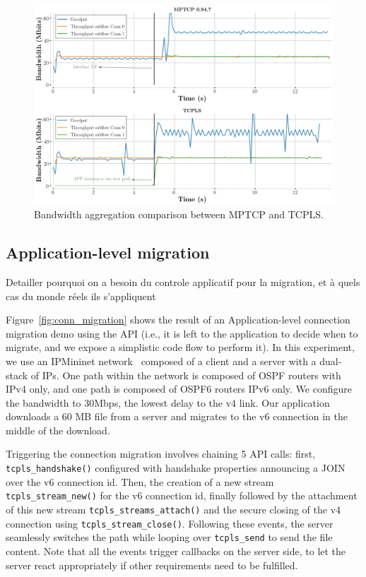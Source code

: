 \begin{figure}[!t] \begin{center}
    \includegraphics[width=\columnwidth]{figures/aggregate_dual.png}
  \end{center} \caption{Bandwidth aggregation comparison between MPTCP and
    TCPLS.} \end{figure}

\subsection{Application-level migration}

Detailler pourquoi on a besoin du controle applicatif pour la migration, et à
quels cas du monde réels ils s'appliquent


Figure~\ref{fig:conn_migration} shows the result of an Application-level
connection migration demo using the API (i.e., it is left to the
application to decide when to migrate, and we expose a simplistic code flow to
perform it). In this experiment, we use an IPMininet network~\cite{ipmininet, jadin2020educational}
composed of a client and a server with a dual-stack of IPs. One path within the
network is composed of OSPF routers with IPv4 only, and one path is composed of
OSPF6 routers IPv6 only. We configure the bandwidth to 30Mbps, the lowest delay
to the v4 link. Our application
downloads a 60 MB file from a server and migrates to the v6 connection in
the middle of the download.

Triggering the connection migration involves chaining 5 API calls:
first, \texttt{tcpls\_handshake()} configured with handshake properties announcing a JOIN over the v6 connection id. Then, the creation of a new stream
\texttt{tcpls\_stream\_new()} for the v6 connection id, finally followed by the attachment of this new stream \texttt{tcpls\_streams\_attach()} and the secure closing of the v4 \tcp connection using \texttt{tcpls\_stream\_close()}. Following these events, the server seamlessly switches the path while looping over \texttt{tcpls\_send} to send the file content. Note that all the events trigger callbacks on the server side, to let the server react appropriately if other requirements need to be fulfilled.

